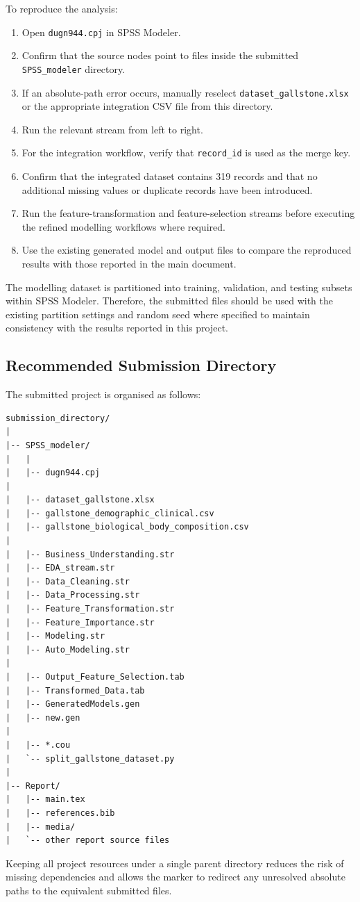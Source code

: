 To reproduce the analysis:

\begin{enumerate}
    \item Open \texttt{dugn944.cpj} in SPSS Modeler.
    \item Confirm that the source nodes point to files inside the submitted
    \texttt{SPSS\_modeler} directory.
    \item If an absolute-path error occurs, manually reselect
    \texttt{dataset\_gallstone.xlsx} or the appropriate integration CSV file
    from this directory.
    \item Run the relevant stream from left to right.
    \item For the integration workflow, verify that
    \texttt{record\_id} is used as the merge key.
    \item Confirm that the integrated dataset contains 319 records and that
    no additional missing values or duplicate records have been introduced.
    \item Run the feature-transformation and feature-selection streams before
    executing the refined modelling workflows where required.
    \item Use the existing generated model and output files to compare the
    reproduced results with those reported in the main document.
\end{enumerate}

The modelling dataset is partitioned into training, validation, and testing
subsets within SPSS Modeler. Therefore, the submitted files should be used
with the existing partition settings and random seed where specified to
maintain consistency with the results reported in this project.

\subsection{Recommended Submission Directory}

The submitted project is organised as follows:

\begin{verbatim}
submission_directory/
|
|-- SPSS_modeler/
|   |
|   |-- dugn944.cpj
|
|   |-- dataset_gallstone.xlsx
|   |-- gallstone_demographic_clinical.csv
|   |-- gallstone_biological_body_composition.csv
|
|   |-- Business_Understanding.str
|   |-- EDA_stream.str
|   |-- Data_Cleaning.str
|   |-- Data_Processing.str
|   |-- Feature_Transformation.str
|   |-- Feature_Importance.str
|   |-- Modeling.str
|   |-- Auto_Modeling.str
|
|   |-- Output_Feature_Selection.tab
|   |-- Transformed_Data.tab
|   |-- GeneratedModels.gen
|   |-- new.gen
|
|   |-- *.cou
|   `-- split_gallstone_dataset.py
|
|-- Report/
|   |-- main.tex
|   |-- references.bib
|   |-- media/
|   `-- other report source files
\end{verbatim}

Keeping all project resources under a single parent directory reduces the
risk of missing dependencies and allows the marker to redirect any unresolved
absolute paths to the equivalent submitted files.
